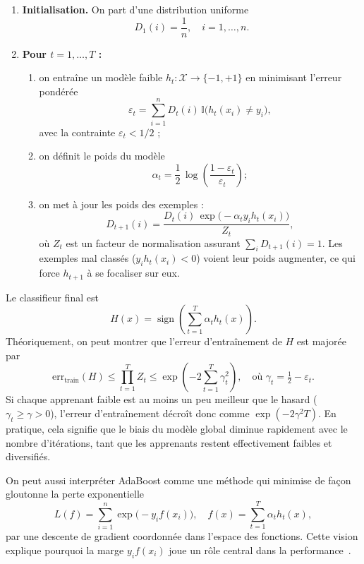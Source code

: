 \begin{enumerate}
  \item \textbf{Initialisation.} On part d'une distribution uniforme
  \[
    D_1(i) = \frac{1}{n}, \quad i = 1,\dots,n.
  \]

  \item \textbf{Pour $t = 1,\dots,T$ :}
  \begin{enumerate}
    \item on entraîne un modèle faible $h_t : \mathcal{X} \to \{-1,+1\}$ en minimisant l'erreur
    pondérée
    \[
      \varepsilon_t = \sum_{i=1}^n D_t(i)\,\mathbb{I}\bigl(h_t(x_i) \neq y_i\bigr),
    \]
    avec la contrainte $\varepsilon_t < 1/2$ ;

    \item on définit le poids du modèle
    \[
      \alpha_t = \frac{1}{2}\,\log\!\left(\frac{1 - \varepsilon_t}{\varepsilon_t}\right) ;
    \]

    \item on met à jour les poids des exemples :
    \[
      D_{t+1}(i)
      = \frac{D_t(i)\,\exp\bigl(-\alpha_t y_i h_t(x_i)\bigr)}{Z_t},
    \]
    où $Z_t$ est un facteur de normalisation assurant $\sum_i D_{t+1}(i) = 1$. Les exemples
    mal classés ($y_i h_t(x_i) < 0$) voient leur poids augmenter, ce qui force $h_{t+1}$ à se
    focaliser sur eux.
  \end{enumerate}
\end{enumerate}

Le classifieur final est
\[
  H(x) = \operatorname{sign}\!\left(\sum_{t=1}^T \alpha_t h_t(x)\right).
\]
Théoriquement, on peut montrer que l'erreur d'entraînement de $H$ est majorée par
~\cite{schapire_boosting_intro_1999,freund_schapire_adaboost_1997}
\[
  \mathrm{err}_{\text{train}}(H)
  \leq \prod_{t=1}^T Z_t
  \leq \exp\!\left(-2\sum_{t=1}^T \gamma_t^2\right),
  \quad
  \text{où } \gamma_t = \tfrac{1}{2} - \varepsilon_t.
\]
Si chaque apprenant faible est au moins un peu meilleur que le hasard ($\gamma_t \ge \gamma > 0$),
l'erreur d'entraînement décroît donc comme $\exp(-2\gamma^2 T)$. En pratique, cela signifie
que le biais du modèle global diminue rapidement avec le nombre d'itérations, tant que les
apprenants restent effectivement faibles et diversifiés.

On peut aussi interpréter AdaBoost comme une méthode qui minimise de façon gloutonne la
perte exponentielle
\[
  L(f) = \sum_{i=1}^n \exp\!\bigl(-y_i f(x_i)\bigr),
  \quad f(x) = \sum_{t=1}^T \alpha_t h_t(x),
\]
par une descente de gradient coordonnée dans l'espace des fonctions. Cette vision explique
pourquoi la marge $y_i f(x_i)$ joue un rôle central dans la performance~\cite{schapire_boosting_intro_1999}.

